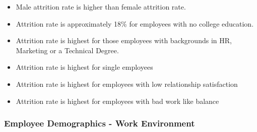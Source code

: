 \documentclass[]{article}
\providecommand{\tightlist}{%
  \setlength{\itemsep}{0pt}\setlength{\parskip}{0pt}}
\begin{document}
\begin{itemize}
\tightlist
\item
  Male attrition rate is higher than female attrition rate.
\item
  Attrition rate is approximately 18\% for employees with no college
  education.
\item
  Attrition rate is highest for those employees with backgrounds in HR,
  Marketing or a Technical Degree.
\item
  Attrition rate is highest for single employees
\item
  Attrition rate is highest for employees with low relationship
  satisfaction
\item
  Attrition rate is highest for employees with bad work like balance
\end{itemize}

\subsubsection{Employee Demographics - Work
Environment}\label{employee-demographics---work-environment-3}
\end{document}
